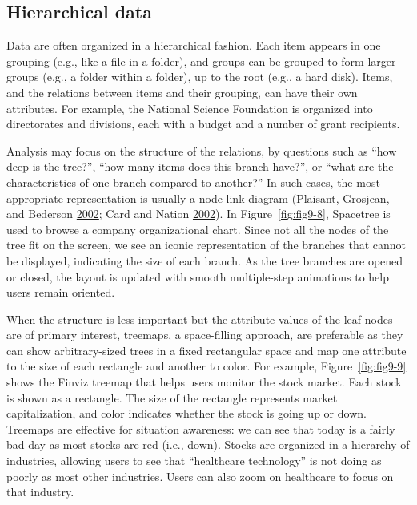 \documentclass[]{krantz}
\begin{document}
\enlargethispage{12pt}

\hypertarget{sec:viz-2.5}{\subsection{Hierarchical
data}\label{sec:viz-2.5}}

Data are often organized in a hierarchical fashion. Each item appears in
one grouping (e.g., like a file in a folder), and groups can be grouped
to form larger groups (e.g., a folder within a folder), up to the root
(e.g., a hard disk). Items, and the relations between items and their
grouping, can have their own attributes. For example, the National
Science Foundation is organized into directorates and divisions, each
with a budget and a number of grant recipients.

Analysis may focus on the structure of the relations, by questions such
as ``how deep is the tree?'', ``how many items does this branch have?'',
or ``what are the characteristics of one branch compared to another?''
In such cases, the most appropriate representation is usually a
node-link diagram (Plaisant, Grosjean, and Bederson
\protect\hyperlink{ref-plaisant2002spacetree}{2002}; Card and Nation
\protect\hyperlink{ref-card2002degree}{2002}). In
Figure~\ref{fig:fig9-8}, Spacetree is used to browse a company
organizational chart. Since not all the nodes of the tree fit on the
screen, we see an iconic representation of the branches that cannot be
displayed, indicating the size of each branch. As the tree branches are
opened or closed, the layout is updated with smooth multiple-step
animations to help users remain oriented.

When the structure is less important but the attribute values of the
leaf nodes are of primary interest, treemaps, a space-filling approach,
are preferable as they can show arbitrary-sized trees in a fixed
rectangular space and map one attribute to the size of each rectangle
and another to color. For example, Figure~\ref{fig:fig9-9} shows the
Finviz treemap that helps users monitor the stock market. Each stock is
shown as a rectangle. The size of the rectangle represents market
capitalization, and color indicates whether the stock is going up or
down. Treemaps are effective for situation awareness: we can see that
today is a fairly bad day as most stocks are red (i.e., down). Stocks
are organized in a hierarchy of industries, allowing users to see that
``healthcare technology'' is not doing as poorly as most other
industries. Users can also zoom on healthcare to focus on that industry.
\end{document}
